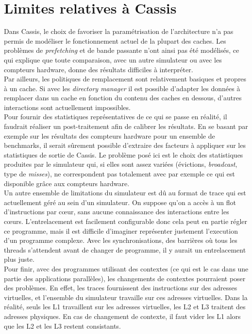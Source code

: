 \section{Limites relatives à \textsf{Cassis}}

Dans \textsf{Cassis}, le choix de favoriser la paramétrisation de l'architecture n'a pas permis de modéliser le fonctionnement actuel de la plupart des caches. Les problèmes de \emph{prefetching} et de bande passante n'ont ainsi pas été modélisés, ce qui explique que toute comparaison, avec un autre simulateur ou avec les compteurs hardware, donne des résultats difficiles à interpréter. \\

Par ailleurs, les politiques de remplacement sont relativement basiques et propres à un cache. Si avec les \emph{directory manager} il est possible d'adapter les données à remplacer dans un cache en fonction du contenu des caches en dessous, d'autres interactions sont actuellement impossibles. \\

Pour fournir des statistiques représentatives de ce qui se passe en réalité, il faudrait réaliser un post-traitement afin de calibrer les résultats. En se basant par exemple sur les résultats des compteurs hardware pour un ensemble de benchmarks, il serait sûrement possible d'extraire des facteurs à appliquer sur les statistiques de sortie de \textsf{Cassis}. Le problème posé ici est le choix des statistiques produites par le simulateur qui, si elles sont assez variées (évictions, \emph{broadcast}, type de \emph{misses}), ne correspondent pas totalement avec par exemple ce qui est disponible grâce aux compteurs hardware. \\

Un autre ensemble de limitations du simulateur est dû au format de trace qui est actuellement géré au sein d'un simulateur. On suppose qu'on a accès à un flot d'instructions par c{\oe}ur, sans aucune connaissance des interactions entre les c{\oe}urs. L'entrelacement est facilement configurable donc cela peut en partie régler ce programme, mais il est difficile d'imaginer représenter justement l'execution d'un programme complexe. Avec les synchronisations, des barrières où tous les threads s'attendent avant de changer de programme, il y aurait un entrelacement plus juste. \\

Pour finir, avec des programmes utilisant des contextes (ce qui est le cas dans une partie des applications parallèles), les changements de contextes pourraient poser des problèmes. En effet, les traces fournissent des instructions sur des adresses virtuelles, et l'ensemble du simulateur travaille sur ces adresses virtuelles. Dans la réalité, seuls les L1 travaillent sur les adresses virtuelles, les L2 et L3 traitent des adresses physiques. En cas de changement de contexte, il faut vider les L1 alors que les L2 et les L3 restent consistants.

